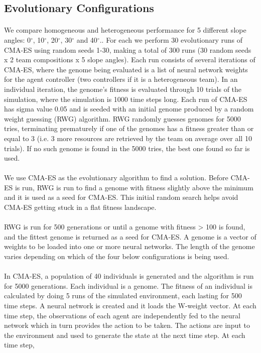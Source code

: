 \documentclass[sigconf]{aamas}  %
\begin{document}
\subsection{Evolutionary Configurations}

\paragraph{}
We compare homogeneous and heterogeneous performance for 5 different slope angles: 0$^{\circ}$, 10$^{\circ}$, 20$^{\circ}$, 30$^{\circ}$ and 40$^{\circ}$.. For each we perform 30 evolutionary runs of CMA-ES using random seeds 1-30, making a total of 300 runs (30 random seeds x 2 team compositions x 5 slope angles). Each run consists of several iterations of CMA-ES, where the genome being evaluated is a list of neural network weights for the agent controller (two controllers if it is a heterogeneous team). In an individual iteration, the genome's fitness is evaluated through 10 trials of the simulation, where the simulation is 1000 time steps long. Each run of CMA-ES has sigma value 0.05 and is seeded with an initial genome produced by a random weight guessing (RWG) algorithm. RWG randomly guesses genomes for 5000 tries, terminating prematurely if one of the genomes has a fitness greater than or equal to 3 (i.e. 3 more resources are retrieved by the team on average over all 10 trials). If no such genome is found in the 5000 tries, the best one found so far is used.

\paragraph{}
We use CMA-ES as the evolutionary algorithm to find a solution. Before CMA-ES is run, RWG is run to find a genome with fitness slightly above the minimum and it is used as a seed for CMA-ES. This initial random search helps avoid CMA-ES getting stuck in a flat fitness landscape.

\paragraph{}
RWG is run for 500 generations or until a genome with fitness > 100 is found, and the fittest genome is returned as a seed for CMA-ES. A genome is a vector of weights to be loaded into one or more neural networks. The length of the genome varies depending on which of the four below configurations is being used. 

\paragraph{}
In CMA-ES, a population of 40 individuals is generated and the algorithm is run for 5000 generations. Each individual is a genome. The fitness of an individual is calculated by doing 5 runs of the simulated environment, each lasting for 500 time steps. A neural network is created and it loads the W-weight vector. At each time step, the observations of each agent are independently fed to the neural network which in turn provides the action to be taken. The actions are input to the environment and used to generate the state at the next time step. At each time step, 
\end{document}
